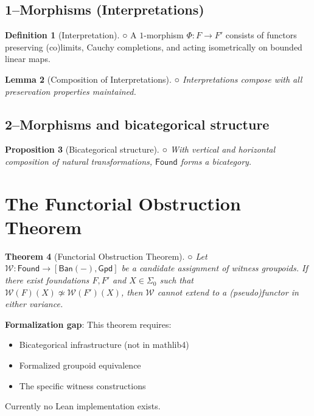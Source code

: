 \documentclass[11pt]{article}
\newtheorem{theorem}{Theorem}[section]
\newtheorem{lemma}[theorem]{Lemma}
\newtheorem{proposition}[theorem]{Proposition}
\theoremstyle{definition}
\newtheorem{definition}[theorem]{Definition}
\theoremstyle{remark}
\newcommand{\leanpending}{\textcolor{red!70!black}{○}}
\newcommand{\Found}{\mathsf{Found}}
\newcommand{\Gpd}{\mathsf{Gpd}}
\newcommand{\Ban}{\mathsf{Ban}}
\begin{document}
\subsection{1--Morphisms (Interpretations)}\label{ssec:Found-1mor}

\begin{definition}[Interpretation]\label{def:interpretation} \leanpending
A \(1\)-morphism \(\Phi:F\to F'\) consists of functors preserving (co)limits, Cauchy completions, and acting isometrically on bounded linear maps.
\end{definition}

\begin{lemma}[Composition of Interpretations]\label{lem:composition} \leanpending
Interpretations compose with all preservation properties maintained.
\end{lemma}

\subsection{2--Morphisms and bicategorical structure}\label{ssec:Found-2mor}

\begin{proposition}[Bicategorical structure]\label{prop:bicat} \leanpending
With vertical and horizontal composition of natural transformations, \(\Found\) forms a bicategory.
\end{proposition}

\section{The Functorial Obstruction Theorem}\label{sec:obstruction}

\begin{theorem}[Functorial Obstruction Theorem]\label{thm:obstruction} \leanpending
Let \(\mathcal{W}:\Found\to[\Ban(-),\Gpd]\) be a candidate assignment of witness groupoids. If there exist foundations \(F,F'\) and \(X\in\Sigma_0\) such that \(\mathcal{W}(F)(X)\not\simeq\mathcal{W}(F')(X)\), then \(\mathcal{W}\) cannot extend to a (pseudo)functor in either variance.
\end{theorem}

\begin{mdframed}[style=gapbox]
\textbf{Formalization gap}: This theorem requires:
\begin{itemize}
\item Bicategorical infrastructure (not in mathlib4)
\item Formalized groupoid equivalence
\item The specific witness constructions
\end{itemize}
Currently no Lean implementation exists.
\end{mdframed}
\end{document}
